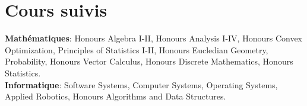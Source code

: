\documentclass[letterpaper,11pt]{article}
\begin{document}
\section{Cours suivis}
\begin{itemize}[leftmargin=0.15in, label={}]
    \normalsize{\item{
     \textbf{Mathématiques}{: Honours Algebra I-II, Honours Analysis I-IV, Honours Convex Optimization, Principles of Statistics I-II, Honours Eucledian Geometry, Probability, Honours Vector Calculus, Honours Discrete Mathematics, Honours Statistics. } \\
     \textbf{Informatique}{: Software Systems, Computer Systems, Operating Systems, Applied Robotics, Honours Algorithms and Data Structures.}
    }}    
 \end{itemize}
\end{document}
